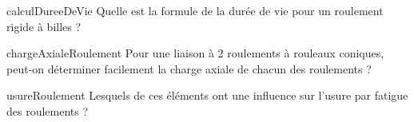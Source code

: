 \documentclass[10pt]{article}
\begin{document}
{%
\begin{question}{calculDureeDeVie}
Quelle est la formule de la durée de vie pour un roulement rigide à billes ?
\begin{multicols}{2}
\begin{reponses}
\end{reponses}
\end{multicols}
\end{question}

\begin{question}{chargeAxialeRoulement}
Pour une liaison à 2 roulements à rouleaux coniques, peut-on déterminer facilement la charge axiale de chacun des roulements ?
\begin{multicols}{2}
\begin{reponses}
\end{reponses}
\end{multicols}
\end{question}


\begin{questionmult}{usureRoulement}
Lesquels de ces éléments ont une influence sur l'usure par fatigue des roulements ?
\begin{multicols}{2}
\begin{reponses}
\end{reponses}
\end{multicols}
\end{questionmult}
}
\end{document}
